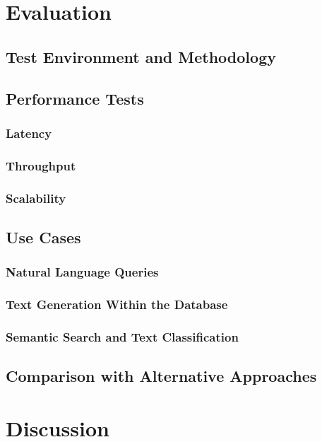 \documentclass{article}
\begin{document}
\section{Evaluation}


\subsection{Test Environment and Methodology}

\subsection{Performance Tests}
\subsubsection{Latency}
\subsubsection{Throughput}
\subsubsection{Scalability}

\subsection{Use Cases}
\subsubsection{Natural Language Queries}
\subsubsection{Text Generation Within the Database}
\subsubsection{Semantic Search and Text Classification}

\subsection{Comparison with Alternative Approaches}

\newpage

\section{Discussion}
\end{document}
